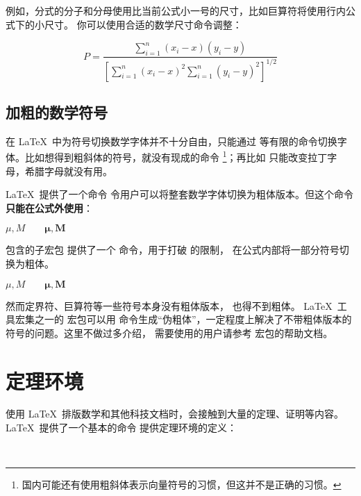 例如，分式的分子和分母使用比当前公式小一号的尺寸，比如巨算符将使用行内公式下的小尺寸。
你可以使用合适的数学尺寸命令调整：
\begin{example}
\[
P = \frac{\displaystyle{
\sum_{i=1}^n (x_i- x)
(y_i- y)}}
{\displaystyle{\left[
\sum_{i=1}^n(x_i-x)^2
\sum_{i=1}^n(y_i- y)^2
\right]^{1/2}}}
\]
\end{example}

\subsection{加粗的数学符号}

在 \LaTeX\ 中为符号切换数学字体并不十分自由，只能通过  等有限的命令切换字体。比如想得到粗斜体的符号，就没有现成的命令%
\footnote{国内可能还有使用粗斜体表示向量符号的习惯，但这并不是正确的习惯。}；再比如  只能改变拉丁字母，希腊字母就没有用。

\LaTeX\ 提供了一个命令  令用户可以将整套数学字体切换为粗体版本。但这个命令\textbf{只能在公式外使用}：
\begin{example}
$\mu, M \qquad
\mathbf{\mu}, \mathbf{M}$
\end{example}

 包含的子宏包  提供了一个  命令，用于打破  的限制，
在公式内部将一部分符号切换为粗体。
\begin{example}
$\mu, M \qquad
\boldsymbol{\mu}, \boldsymbol{M}$
\end{example}

然而定界符、巨算符等一些符号本身没有粗体版本， 也得不到粗体。
\LaTeX\ 工具宏集之一的  宏包可以用  命令生成“伪粗体”，一定程度上解决了不带粗体版本的符号的问题。这里不做过多介绍，
需要使用的用户请参考  宏包的帮助文档。

\section{定理环境}

使用 \LaTeX\ 排版数学和其他科技文档时，会接触到大量的定理、证明等内容。
\LaTeX\ 提供了一个基本的命令  提供定理环境的定义：
\begin{command}
 \\
\end{command}

